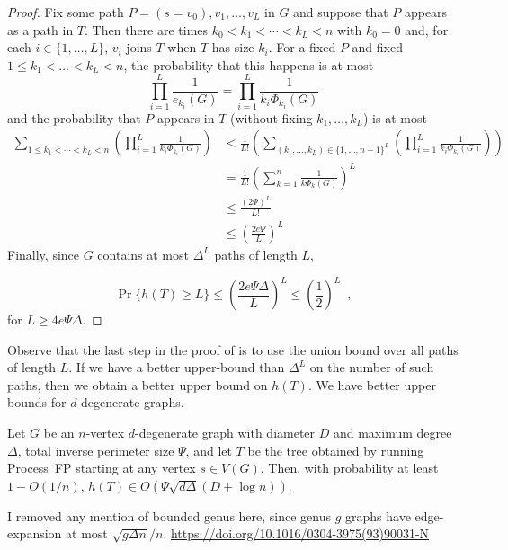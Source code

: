 \documentclass{patmorin}
\begin{document}
\begin{proof}
   Fix some path $P=(s=v_0),v_1,\ldots,v_L$ in $G$ and suppose that $P$
   appears as a path in $T$.  Then there are times $k_0<k_1<\cdots<k_L<n$
   with $k_0=0$ and, for each $i\in\{1,\ldots,L\}$, $v_i$ joins $T$ when
   $T$ has size $k_i$.  For a fixed $P$ and fixed $1\le k_1<\ldots<k_L<n$,
   the probability that this happens is at most
   \[
       \prod_{i=1}^{L} \frac{1}{e_{k_i}(G)} 
           = \prod_{i=1}^{L} \frac{1}{k_i\Phi_{k_i}(G)} 
   \]  
   and the probability that $P$ appears in $T$ (without fixing
   $k_1,\ldots,k_L$) is at most
   \begin{align*}
       \sum_{1\le k_1<\cdots<k_L< n}
        \left(
         \prod_{i=1}^{L} \frac{1}{k_i\Phi_{k_i}(G)}
        \right) &
       < 
       \frac{1}{L!}\left(\sum_{(k_1,\ldots,k_L)\in\{1,\ldots,n-1\}^L}
        \left(
         \prod_{i=1}^{L} \frac{1}{k_i\Phi_{k_i}(G)}
        \right)\right)  \\
       &= \frac{1}{L!}\left(\sum_{k=1}^n\frac{1}{k\Phi_k(G)}\right)^L \\
       &\le \frac{(2\Psi)^L}{L!} \\
       &\le \left(\frac{2e\Psi}{L}\right)^L
   \end{align*}
   Finally, since $G$ contains at most $\Delta^L$ paths of length $L$,
   
   \[
        \Pr\{h(T) \ge L\} \le \left(\frac{2e\Psi\Delta}{L}\right)^L
         \le \left(\frac{1}{2}\right)^L \enspace ,
   \]
   for $L\ge 4e\Psi\Delta$.
\end{proof}

Observe that the last step in the proof of
 is to use the union bound over all
paths of length $L$.  If we have a better upper-bound than $\Delta^L$ on
the number of such paths, then we obtain a better upper bound on $h(T)$.
We have better upper bounds for $d$-degenerate graphs.

\begin{cor}
  Let $G$ be an $n$-vertex $d$-degenerate graph with diameter $D$
  and maximum degree $\Delta$, total inverse perimeter size $\Psi$,
  and let $T$ be the tree obtained by running Process~FP starting at
  any vertex $s\in V(G)$.  Then, with probability at least $1-O(1/n)$,
  $h(T)\in O(\Psi\sqrt{d\Delta}(D+\log n))$.
\end{cor}

\begin{todo}
I removed any mention of bounded genus here, since genus
$g$ graphs have edge-expansion at most $\sqrt{g\Delta n}/n$.
\url{https://doi.org/10.1016/0304-3975(93)90031-N}
\end{todo}
\end{document}
